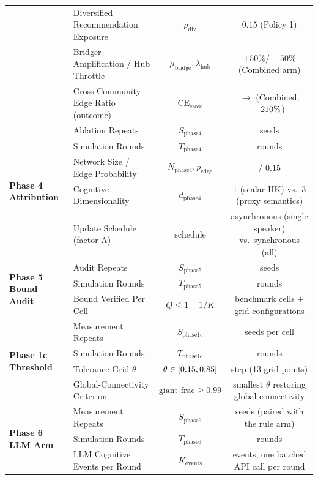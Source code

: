 \begin{table}[t]
\begin{tabular}{llcc}
& Diversified Recommendation Exposure & $\rho_{\mathrm{div}}$ & $0.15$ (Policy 1) \\
& Bridger Amplification / Hub Throttle & $\mu_{\mathrm{bridge}}, \lambda_{\mathrm{hub}}$ & $+50\% / -50\%$ (Combined arm) \\
& Cross-Community Edge Ratio (outcome) & $\mathrm{CE}_{\mathrm{cross}}$ & \CrossEdgeBase{} $\rightarrow$ \CrossEdgeComb{} (Combined, $+210\%$) \\
\midrule
\multirow{5}{*}{\textbf{Phase 4 Attribution}} 
& Ablation Repeats & $S_{\mathrm{phase4}}$ & \PhaseFourSeeds{} seeds \\
& Simulation Rounds & $T_{\mathrm{phase4}}$ & \PhaseFourRounds{} rounds \\
& Network Size / Edge Probability & $N_{\mathrm{phase4}}, p_{\mathrm{edge}}$ & \PhaseFourNodes{} / $0.15$ \\
& Cognitive Dimensionality & $d_{\mathrm{phase4}}$ & $1$ (scalar HK) vs.\ $3$ (proxy semantics) \\
& Update Schedule (factor A) & $\mathrm{schedule}$ & asynchronous (single speaker) vs.\ synchronous (all) \\
\midrule
\multirow{3}{*}{\textbf{Phase 5 Bound Audit}} 
& Audit Repeats & $S_{\mathrm{phase5}}$ & \PhaseFiveSeeds{} seeds \\
& Simulation Rounds & $T_{\mathrm{phase5}}$ & \PhaseFiveRounds{} rounds \\
& Bound Verified Per Cell & $Q \leq 1 - 1/K$ & \AuditCellsChecked{} benchmark cells $+$ \HOneGridCount{} grid configurations \\
\midrule
\multirow{4}{*}{\textbf{Phase 1c Threshold}} 
& Measurement Repeats & $S_{\mathrm{phase1c}}$ & \ThresholdSeeds{} seeds per cell \\
& Simulation Rounds & $T_{\mathrm{phase1c}}$ & \ThresholdRounds{} rounds \\
& Tolerance Grid $\theta$ & $\theta \in [0.15, 0.85]$ & step \ThresholdGridStep{} (13 grid points) \\
& Global-Connectivity Criterion & $\text{giant\_frac} \geq 0.99$ & smallest $\theta$ restoring global connectivity \\
\midrule
\multirow{4}{*}{\textbf{Phase 6 LLM Arm}} 
& Measurement Repeats & $S_{\mathrm{phase6}}$ & \LlmArmSeeds{} seeds (paired with the rule arm) \\
& Simulation Rounds & $T_{\mathrm{phase6}}$ & \LlmArmRounds{} rounds \\
& LLM Cognitive Events per Round & $K_{\mathrm{events}}$ & \LlmArmEventsPerRound{} events, one batched API call per round \\

\end{tabular}
\end{table}
